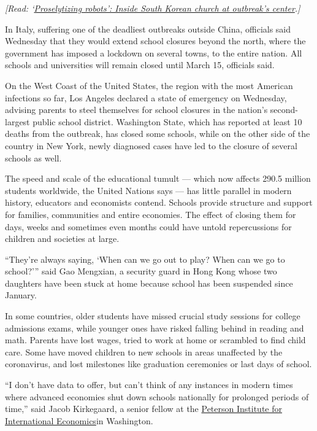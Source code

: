 \emph{{[}Read:
`}\href{https://www.nytimes.com/2020/03/10/world/asia/south-korea-coronavirus-shincheonji.html}{\emph{Proselytizing
robots': Inside South Korean church at outbreak's center}}\emph{.{]}}

In Italy, suffering one of the deadliest outbreaks outside China,
officials said Wednesday that they would extend school closures beyond
the north, where the government has imposed a lockdown on several towns,
to the entire nation. All schools and universities will remain closed
until March 15, officials said.

On the West Coast of the United States, the region with the most
American infections so far, Los Angeles declared a state of emergency on
Wednesday, advising parents to steel themselves for school closures in
the nation's second-largest public school district. Washington State,
which has reported at least 10 deaths from the outbreak, has closed some
schools, while on the other side of the country in New York, newly
diagnosed cases have led to the closure of several schools as well.

The speed and scale of the educational tumult --- which now affects
290.5 million students worldwide, the United Nations says --- has little
parallel in modern history, educators and economists contend. Schools
provide structure and support for families, communities and entire
economies. The effect of closing them for days, weeks and sometimes even
months could have untold repercussions for children and societies at
large.

``They're always saying, `When can we go out to play? When can we go to
school?''' said Gao Mengxian, a security guard in Hong Kong whose two
daughters have been stuck at home because school has been suspended
since January.

In some countries, older students have missed crucial study sessions for
college admissions exams, while younger ones have risked falling behind
in reading and math. Parents have lost wages, tried to work at home or
scrambled to find child care. Some have moved children to new schools in
areas unaffected by the coronavirus, and lost milestones like graduation
ceremonies or last days of school.

``I don't have data to offer, but can't think of any instances in modern
times where advanced economies shut down schools nationally for
prolonged periods of time,'' said Jacob Kirkegaard, a senior fellow at
the \href{https://www.piie.com/}{Peterson Institute for International
Economics}in Washington.

